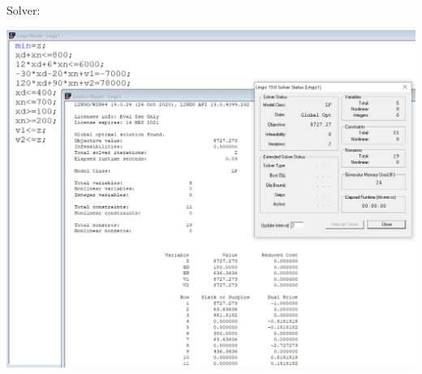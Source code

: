 \documentclass[a4paper,11pt]{article}
\begin{document}
Solver: \\

\begin{centering}
	\includegraphics[width=0.65\linewidth]{src/blatt_7_aufgabe_2_solverloesung_3.png}
\end{centering}
\end{document}
